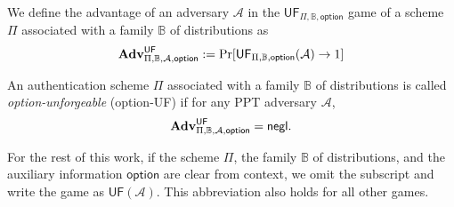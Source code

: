 
We define the advantage of an adversary $\mathcal{A}$ in the $\textsf{UF}_{\Pi, \mathbb{B}, \textsf{option}}$ game of a scheme $\Pi$ associated with a family $\mathbb{B}$ of distributions as
\[
	\mathbf{Adv}^{\textsf{UF}}_{\Pi, \mathbb{B}, \mathcal{A}, \textsf{option}} := \Pr[\textsf{UF}_{\Pi, \mathbb{B}, \textsf{option}}(\mathcal{A}) \to 1]
\]

An authentication scheme $\Pi$ associated with a family $\mathbb{B}$ of distributions is called \emph{\textsf{option}-unforgeable} (\textsf{option}-UF) if for any PPT adversary $\mathcal{A}$,
\[
	\mathbf{Adv}^{\textsf{UF}}_{\Pi, \mathbb{B}, \mathcal{A}, \textsf{option}} = \mathsf{negl}.
\]

For the rest of this work, if the scheme $\Pi$, the family $\mathbb{B}$ of distributions, and the auxiliary information $\textsf{option}$ are clear from context, we omit the subscript and write the game as $\textsf{UF}(\mathcal{A})$. This abbreviation also holds for all other games.

